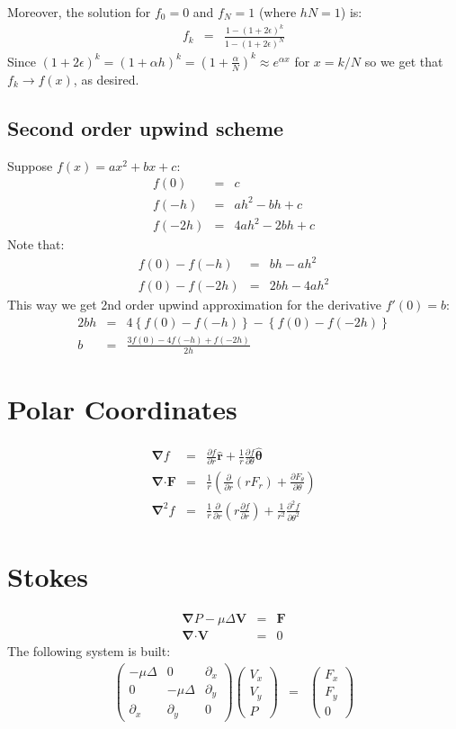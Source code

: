 \documentclass[11pt]{article}
\newcommand\eps \epsilon
\newcommand{\mat}[2]{\left(\begin{array}{#1}#2\end{array}\right)}
\providecommand\bnabla{\boldsymbol{\nabla}}
\providecommand\bcdot{\boldsymbol{\cdot}}
\begin{document}
Moreover, the solution for $f_0 = 0$ and $f_N = 1$ (where $h N = 1$) is:
\begin{eqnarray}
f_k &=& \frac{1 - (1+2\eps)^k}{1 - (1+2\eps)^N}
\end{eqnarray}
Since $(1+2\eps)^k = (1+\alpha h)^k = \left(1 + \frac{\alpha}{N}\right)^k \approx e^{\alpha x}$ for $x = k/N$
so we get that $f_k \rightarrow f(x)$, as desired.
\subsection{Second order upwind scheme}
Suppose $f(x) = ax^2 + bx + c$:
\begin{eqnarray}
  f(0) &=& c \\
  f(-h) &=& ah^2 - bh + c \\
  f(-2h) &=& 4ah^2 - 2bh + c
\end{eqnarray}
Note that:
\begin{eqnarray}
  f(0) - f(-h) &=& bh - ah^2 \\
  f(0) - f(-2h) &=& 2bh - 4ah^2
\end{eqnarray}
This way we get 2nd order upwind approximation for the derivative $f'(0) = b$:
\begin{eqnarray}
  2bh &=& 4\left\{f(0) - f(-h)\right\} - \left\{f(0) - f(-2h)\right\} \\
  b &=& \frac{3f(0) - 4f(-h) + f(-2h)}{2h}
\end{eqnarray}

\section{Polar Coordinates}
\begin{eqnarray}
\bnabla f &=& \frac{\partial f}{\partial r} \mathbf{\hat{r}} +
\frac{1}{r} \frac{\partial f}{\partial \theta} \mathbf{\hat{\theta}}
\\
\bnabla \mathbf{\cdot} \mathbf{F} &=& \frac{1}{r}
\left(
\frac{\partial}{\partial r} (r F_r) +
\frac{\partial F_\theta}{\partial \theta}
\right)
\\
\bnabla^2 f &=& \frac{1}{r}\frac{\partial}{\partial r}
\left( r \frac{\partial f}{\partial r} \right) +
\frac{1}{r^2}\frac{\partial^2 f}{\partial \theta^2}
\end{eqnarray}

\section{Stokes}
\begin{eqnarray}
 \bnabla P - \mu \Delta \mathbf{V} &=& \mathbf{F} \\
 \bnabla \bcdot \mathbf{V} &=& 0
\end{eqnarray}
The following system is built:
\begin{eqnarray}
 \mat{ccc}{-\mu\Delta & 0 & \partial_x \\ 0 & -\mu\Delta & \partial_y \\ \partial_x & \partial_y & 0}
 \mat{c}{V_x \\ V_y \\ P} &=& \mat{c}{F_x \\ F_y \\ 0}
\end{eqnarray}
\end{document}
